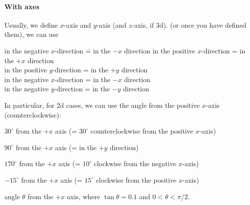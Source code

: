 \documentclass[11pt,pdfa,lastpage]{MishoNote}
\begin{document}
\paragraph{With axes}
Usually, we define $x$-axis and $y$-axis (and $z$-axis, if 3d).  (or once you have defined them), we can use
\begin{tabbing}
  \fakebullet \= in the negative $x$-direction \= = in the $-x$ direction\kill
  \fakebullet \> in the positive $x$-direction \> = in the $+x$ direction\\[\itemsep]
  \fakebullet \> in the positive $y$-direction \> = in the $+y$ direction\\[\itemsep]
  \fakebullet \> in the negative $x$-direction \> = in the $-x$ direction\\[\itemsep]
  \fakebullet \> in the negative $y$-direction \> = in the $-y$ direction
 \end{tabbing}
In particular, for 2d cases, we can use the angle from the positive $x$-axis (counterclockwise):
 \begin{miniitemize}
  \item $30^\circ$ from the $+x$ axis (= $30^\circ$ counterclockwise from the positive $x$-axis)
  \item $90^\circ$ from the $+x$ axis (= in the $+y$ direction)
  \item $170^\circ$ from the $+x$ axis (= $10^\circ$ clockwise from the negative $x$-axis)
  \item $-15^\circ$ from the $+x$ axis (= $15^\circ$ clockwise from the positive $x$-axis)
  \item angle $\theta$ from the $+x$ axis, where $\tan\theta=0.1$ and $0<\theta<\pi/2$.
 \end{miniitemize}
\end{document}
